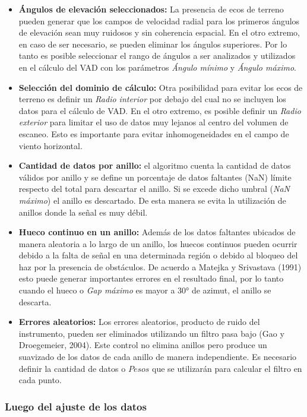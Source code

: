 \documentclass[12pt,spanish,oneside, a4paper]{book}
\providecommand{\tightlist}{%
  \setlength{\itemsep}{0pt}\setlength{\parskip}{0pt}}
\begin{document}
\begin{itemize}
\tightlist
\item
  \textbf{Ángulos de elevación seleccionados:} La presencia de ecos de
  terreno pueden generar que los campos de velocidad radial para los
  primeros ángulos de elevación sean muy ruidosos y sin coherencia
  espacial. En el otro extremo, en caso de ser necesario, se pueden
  eliminar los ángulos superiores. Por lo tanto es posible seleccionar
  el rango de ángulos a ser analizados y utilizados en el cálculo del
  VAD con los parámetros \emph{Ángulo mínimo} y \emph{Ángulo máximo}.
\item
  \textbf{Selección del dominio de cálculo:} Otra posibilidad para
  evitar los ecos de terreno es definir un \emph{Radio interior} por
  debajo del cual no se incluyen los datos para el cálculo de VAD. En el
  otro extremo, es posible definir un \emph{Radio exterior} para limitar
  el uso de datos muy lejanos al centro del volumen de escaneo. Esto es
  importante para evitar inhomogeneidades en el campo de viento
  horizontal.
\item
  \textbf{Cantidad de datos por anillo:} el algoritmo cuenta la cantidad
  de datos válidos por anillo y se define un porcentaje de datos
  faltantes (NaN) límite respecto del total para descartar el anillo. Si
  se excede dicho umbral (\emph{NaN máximo}) el anillo es descartado. De
  esta manera se evita la utilización de anillos donde la señal es muy
  débil.
\item
  \textbf{Hueco continuo en un anillo:} Además de los datos faltantes
  ubicados de manera aleatoria a lo largo de un anillo, los huecos
  continuos pueden ocurrir debido a la falta de señal en una determinada
  región o debido al bloqueo del haz por la presencia de obstáculos. De
  acuerdo a Matejka y Srivastava (1991) esto puede generar importantes
  errores en el resultado final, por lo tanto cuando el hueco o
  \emph{Gap máximo} es mayor a 30° de azimut, el anillo se descarta.
\item
  \textbf{Errores aleatorios:} Los errores aleatorios, producto de ruido
  del instrumento, pueden ser eliminados utilizando un filtro pasa bajo
  (Gao y Droegemeier, 2004). Este control no elimina anillos pero
  produce un suavizado de los datos de cada anillo de manera
  independiente. Es necesario definir la cantidad de datos o \(Pesos\)
  que se utilizarán para calcular el filtro en cada punto.
\end{itemize}

\subsubsection{Luego del ajuste de los
datos}\label{luego-del-ajuste-de-los-datos}
\end{document}
